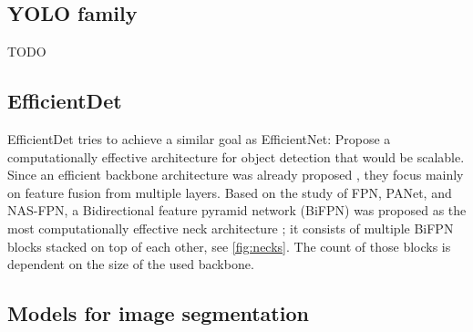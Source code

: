 \subsection{YOLO family}
TODO

\subsection{EfficientDet}
EfficientDet tries to achieve a similar goal as EfficientNet: Propose a computationally effective architecture for object detection that would be scalable. Since an efficient backbone architecture was already proposed \cite{Tan2019a}, they focus mainly on feature fusion from multiple layers. Based on the study of FPN, PANet, and NAS-FPN, a Bidirectional feature pyramid network (BiFPN) was proposed as the most computationally effective neck architecture \cite{Tan2019}; it consists of multiple BiFPN blocks stacked on top of each other, see \ref{fig:necks}. The count of those blocks is dependent on the size of the used backbone.

\subsection{Models for image segmentation}
